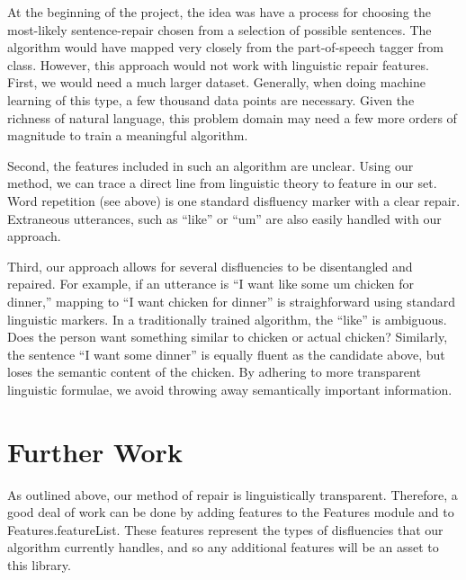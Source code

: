 \documentclass{article}
\begin{document}
\begin{flushleft}

  At the beginning of the project, the idea was have a process for choosing the most-likely sentence-repair chosen from a selection of possible sentences. The algorithm would have mapped very closely from the part-of-speech tagger from class. However, this approach would not work with linguistic repair features. First, we would need a much larger dataset. Generally, when doing machine learning of this type, a few thousand data points are necessary. Given the richness of natural language, this problem domain may need a few more orders of magnitude to train a meaningful algorithm.

\end{flushleft}

\begin{flushleft}
  
  Second, the features included in such an algorithm are unclear. Using our method, we can trace a direct line from linguistic theory to feature in our set. Word repetition (see above) is one standard disfluency marker with a clear repair. Extraneous utterances, such as ``like'' or ``um'' are also easily handled with our approach.
  
\end{flushleft}

\begin{flushleft}
  
  Third, our approach allows for several disfluencies to be disentangled and repaired. For example, if an utterance is ``I want like some um chicken for dinner,'' mapping to ``I want chicken for dinner'' is straighforward using standard linguistic markers. In a traditionally trained algorithm, the ``like'' is ambiguous. Does the person want something similar to chicken or actual chicken? Similarly, the sentence ``I want some dinner'' is equally fluent as the candidate above, but loses the semantic content of the chicken. By adhering to more transparent linguistic formulae, we avoid throwing away semantically important information.

\end{flushleft}

\section{Further Work}

\begin{flushleft}

  As outlined above, our method of repair is linguistically transparent. Therefore, a good deal of work can be done by adding features to the Features module and to Features.featureList. These features represent the types of disfluencies that our algorithm currently handles, and so any additional features will be an asset to this library.
  
\end{flushleft}
\end{document}
